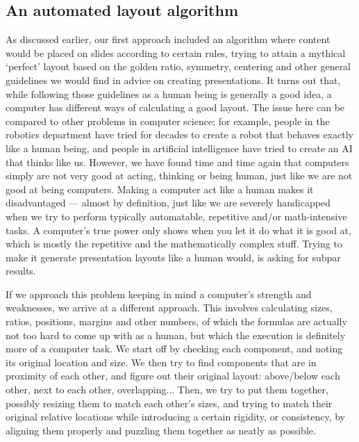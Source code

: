    \subsection{An automated layout algorithm}

    As discussed earlier, our first approach included an algorithm where
    content would be placed on slides according to certain rules, trying to
    attain a mythical `perfect' layout based on the golden ratio, symmetry,
    centering and other general guidelines we would find in advice on creating
    presentations. It turns out that, while following those guidelines as a
    human being is generally a good idea, a computer has different ways of
    calculating a good layout. The issue here can be compared to other problems
    in computer science; for example, people in the robotics department have
    tried for decades to create a robot that behaves exactly like a human
    being, and people in artificial intelligence have tried to create an AI
    that thinks like us. However, we have found time and time again that
    computers simply are not very good at acting, thinking or being human, just
    like we are not good at being computers. Making a computer act like a human
    makes it disadvantaged --- almost by definition, just like we are severely
    handicapped when we try to perform typically automatable, repetitive and/or
    math-intensive tasks. A computer's true power only shows when you let it do
    what it is good at, which is mostly the repetitive and the mathematically
    complex stuff. Trying to make it generate presentation layouts like a
    human would, is asking for subpar results.

    If we approach this problem keeping in mind a computer's strength and
    weaknesses, we arrive at a different approach. This involves calculating
    sizes, ratios, positions, margins and other numbers, of which the formulas
    are actually not too hard to come up with as a human, but which the
    execution is definitely more of a computer task. We start off by checking
    each component, and noting its original location and size. We then try to
    find components that are in proximity of each other, and figure out their
    original layout: above/below each other, next to each other, overlapping...
    Then, we try to put them together, possibly resizing them to match each
    other's sizes, and trying to match their original relative locations while
    introducing a certain rigidity, or consistency, by aligning them properly
    and puzzling them together as neatly as possible.
   
